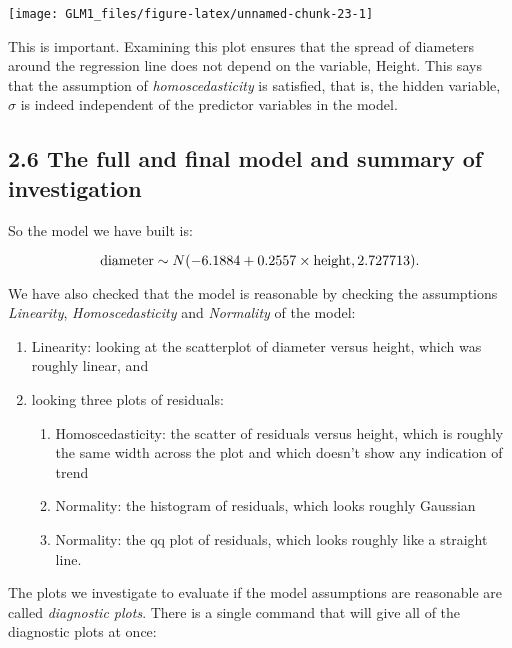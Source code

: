 \documentclass[
]{article}
\begin{document}
\begin{center}\texttt{[image: GLM1\_files/figure-latex/unnamed-chunk-23-1]} \end{center}

This is important. Examining this plot ensures that the spread of
diameters around the regression line does not depend on the variable,
Height. This says that the assumption of \emph{homoscedasticity} is
satisfied, that is, the hidden variable, \(\sigma\) is indeed
independent of the predictor variables in the model.

\hypertarget{the-full-and-final-model-and-summary-of-investigation}{%
\subsection{2.6 The full and final model and summary of
investigation}\label{the-full-and-final-model-and-summary-of-investigation}}

So the model we have built is:

\[
{\rm diameter} \sim N(-6.1884 + 0.2557 \times  {\rm height}, 2.727713).
\]

We have also checked that the model is reasonable by checking the
assumptions \emph{Linearity}, \emph{Homoscedasticity} and
\emph{Normality} of the model:

\begin{enumerate}
\def\labelenumi{\arabic{enumi}.}
\item
  Linearity: looking at the scatterplot of diameter versus height, which
  was roughly linear, and
\item
  looking three plots of residuals:

  \begin{enumerate}
  \def\labelenumii{\alph{enumii}.}
  \item
    Homoscedasticity: the scatter of residuals versus height, which is
    roughly the same width across the plot and which doesn't show any
    indication of trend
  \item
    Normality: the histogram of residuals, which looks roughly Gaussian
  \item
    Normality: the qq plot of residuals, which looks roughly like a
    straight line.
  \end{enumerate}
\end{enumerate}

The plots we investigate to evaluate if the model assumptions are
reasonable are called \emph{diagnostic plots}. There is a single command
that will give all of the diagnostic plots at once:
\end{document}
